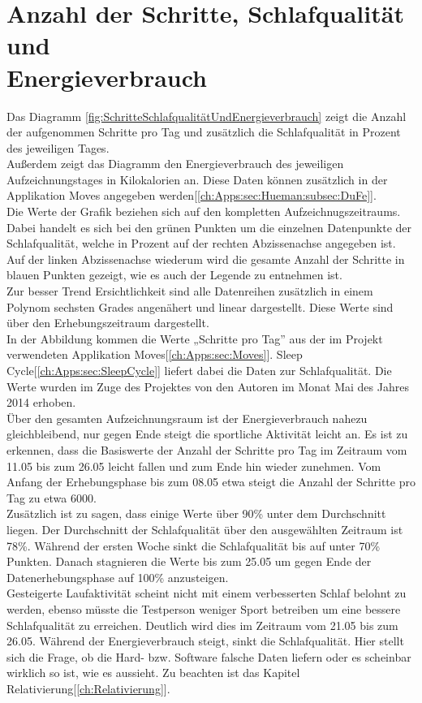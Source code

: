 \section{Anzahl der Schritte, Schlafqualität und\\ Energieverbrauch}
\label{ch:AnalyseUndEvaluierung:sec:SchritteSchlafqualitätUndEnergieverbrauch}


Das Diagramm \ref{fig:SchritteSchlafqualitätUndEnergieverbrauch} zeigt die Anzahl der aufgenommen Schritte pro Tag und zusätzlich die Schlafqualität in Prozent des jeweiligen Tages. \\
Außerdem zeigt das Diagramm den Energieverbrauch des jeweiligen Aufzeichnungstages in Kilokalorien an.
Diese Daten können zusätzlich in der Applikation Moves angegeben werden[\ref{ch:Apps:sec:Hueman:subsec:DuFe}]. \\ 
Die Werte der Grafik beziehen sich auf den kompletten Aufzeichnugszeitraums. 
Dabei handelt es sich bei den grünen Punkten um die einzelnen Datenpunkte der Schlafqualität, welche in Prozent auf der rechten Abzissenachse angegeben ist.
Auf der linken Abzissenachse wiederum wird die gesamte Anzahl der Schritte in blauen Punkten gezeigt, wie es auch der Legende zu entnehmen ist. \\
Zur besser Trend Ersichtlichkeit sind alle Datenreihen zusätzlich in einem Polynom sechsten Grades angenähert und linear dargestellt.
Diese Werte sind über den Erhebungszeitraum dargestellt. \\
In der Abbildung kommen die Werte „Schritte pro Tag” aus der im Projekt verwendeten Applikation Moves[\ref{ch:Apps:sec:Moves}]. 
Sleep Cycle[\ref{ch:Apps:sec:SleepCycle}] liefert dabei die Daten zur Schlafqualität.
Die Werte wurden im Zuge des Projektes von den Autoren im Monat Mai des Jahres 2014 erhoben. \\
Über den gesamten Aufzeichnungsraum ist der Energieverbrauch nahezu gleichbleibend, nur gegen Ende steigt die sportliche Aktivität leicht an.
Es ist zu erkennen, dass die Basiswerte der Anzahl der Schritte pro Tag im Zeitraum vom 11.05 bis zum 26.05 leicht fallen und zum Ende hin wieder zunehmen. 
Vom Anfang der Erhebungsphase bis zum 08.05 etwa steigt die Anzahl der Schritte pro Tag zu etwa 6000. \\
Zusätzlich ist zu sagen, dass einige Werte über 90\% unter dem Durchschnitt liegen.
Der Durchschnitt der Schlafqualität über den ausgewählten Zeitraum ist 78\%.
Während der ersten Woche sinkt die Schlafqualität bis auf unter 70\% Punkten.
Danach stagnieren die Werte bis zum 25.05 um gegen Ende der Datenerhebungsphase auf 100\% anzusteigen.
\\
Gesteigerte Laufaktivität scheint nicht mit einem verbesserten Schlaf belohnt zu werden, ebenso müsste die Testperson weniger Sport betreiben um eine bessere Schlafqualität zu erreichen.
Deutlich wird dies im Zeitraum vom 21.05 bis zum 26.05. 
Während der Energieverbrauch steigt, sinkt die Schlafqualität.
Hier stellt sich die Frage, ob die Hard- bzw. Software falsche Daten liefern oder es scheinbar wirklich so ist, wie es aussieht.
Zu beachten ist das Kapitel Relativierung[\ref{ch:Relativierung}].

